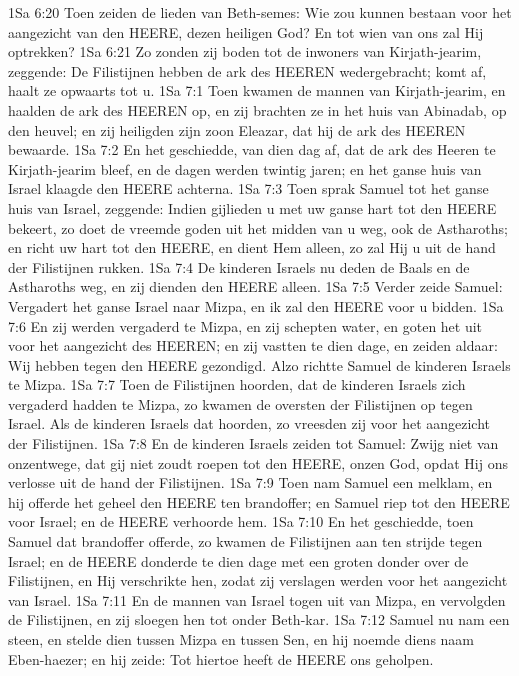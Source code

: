 1Sa 6:20  Toen zeiden de lieden van Beth-semes: Wie zou kunnen bestaan voor het aangezicht van den HEERE, dezen heiligen God? En tot wien van ons zal Hij optrekken?
1Sa 6:21  Zo zonden zij boden tot de inwoners van Kirjath-jearim, zeggende: De Filistijnen hebben de ark des HEEREN wedergebracht; komt af, haalt ze opwaarts tot u.
1Sa 7:1  Toen kwamen de mannen van Kirjath-jearim, en haalden de ark des HEEREN op, en zij brachten ze in het huis van Abinadab, op den heuvel; en zij heiligden zijn zoon Eleazar, dat hij de ark des HEEREN bewaarde.
1Sa 7:2  En het geschiedde, van dien dag af, dat de ark des Heeren te Kirjath-jearim bleef, en de dagen werden twintig jaren; en het ganse huis van Israel klaagde den HEERE achterna.
1Sa 7:3  Toen sprak Samuel tot het ganse huis van Israel, zeggende: Indien gijlieden u met uw ganse hart tot den HEERE bekeert, zo doet de vreemde goden uit het midden van u weg, ook de Astharoths; en richt uw hart tot den HEERE, en dient Hem alleen, zo zal Hij u uit de hand der Filistijnen rukken.
1Sa 7:4  De kinderen Israels nu deden de Baals en de Astharoths weg, en zij dienden den HEERE alleen.
1Sa 7:5  Verder zeide Samuel: Vergadert het ganse Israel naar Mizpa, en ik zal den HEERE voor u bidden.
1Sa 7:6  En zij werden vergaderd te Mizpa, en zij schepten water, en goten het uit voor het aangezicht des HEEREN; en zij vastten te dien dage, en zeiden aldaar: Wij hebben tegen den HEERE gezondigd. Alzo richtte Samuel de kinderen Israels te Mizpa.
1Sa 7:7  Toen de Filistijnen hoorden, dat de kinderen Israels zich vergaderd hadden te Mizpa, zo kwamen de oversten der Filistijnen op tegen Israel. Als de kinderen Israels dat hoorden, zo vreesden zij voor het aangezicht der Filistijnen.
1Sa 7:8  En de kinderen Israels zeiden tot Samuel: Zwijg niet van onzentwege, dat gij niet zoudt roepen tot den HEERE, onzen God, opdat Hij ons verlosse uit de hand der Filistijnen.
1Sa 7:9  Toen nam Samuel een melklam, en hij offerde het geheel den HEERE ten brandoffer; en Samuel riep tot den HEERE voor Israel; en de HEERE verhoorde hem.
1Sa 7:10  En het geschiedde, toen Samuel dat brandoffer offerde, zo kwamen de Filistijnen aan ten strijde tegen Israel; en de HEERE donderde te dien dage met een groten donder over de Filistijnen, en Hij verschrikte hen, zodat zij verslagen werden voor het aangezicht van Israel.
1Sa 7:11  En de mannen van Israel togen uit van Mizpa, en vervolgden de Filistijnen, en zij sloegen hen tot onder Beth-kar.
1Sa 7:12  Samuel nu nam een steen, en stelde dien tussen Mizpa en tussen Sen, en hij noemde diens naam Eben-haezer; en hij zeide: Tot hiertoe heeft de HEERE ons geholpen.
